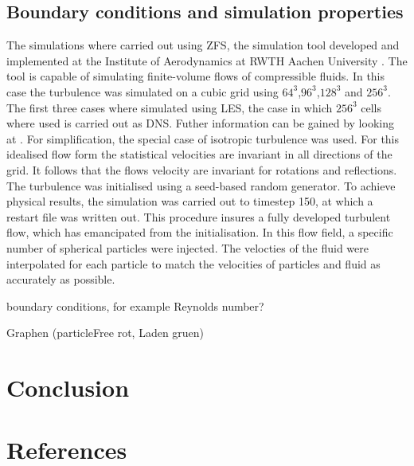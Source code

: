 \documentclass[a4paper,10pt]{article}
\numberwithin{equation}{section} %
\begin{document}
\subsection{Boundary conditions and simulation properties}
The simulations where carried out using ZFS, the simulation tool developed and implemented at the Institute of Aerodynamics at RWTH Aachen University 
\cite{anAdaptiveMultilevelMultigridFormulationForCartesianHierarchicalGridMethods} \cite{aStrictlyConservativeCartesianCutCellMethodForCompressibleViscousFlowsOnAdaptiveGrids}. 
The tool is capable of simulating finite-volume flows of compressible fluids. 
In this case the turbulence was simulated on a cubic grid using $64^3$,$96^3$,$128^3$ and $256^3$. The first three cases where simulated using LES, 
the case in which $256^3$ cells where used is carried out as DNS. Futher information can be gained by looking at \cite[p.344-357 for DNS and p. 558-639 for LES]{turbulentFlows}.
For simplification, the special case of isotropic turbulence was used. For this idealised flow form the statistical 
velocities are invariant in all directions of the grid. It follows that the flows velocity are invariant for rotations and reflections. 
The turbulence was initialised using a seed-based random generator. To achieve physical results, the simulation was carried out  to timestep 150, 
at which a restart file was written out. This procedure insures a fully developed turbulent 
flow, which has emancipated from the initialisation. In this flow field, a specific number of spherical particles were injected. 
The velocties of the fluid were interpolated for each particle to match the velocities of particles and fluid as accurately as possible.

boundary conditions, for example Reynolds number?


Graphen (particleFree rot, Laden gruen)
\pagebreak
\section{Conclusion}
\pagebreak
\section{References}
\nocite{*} %
\pagebreak
\end{document}
